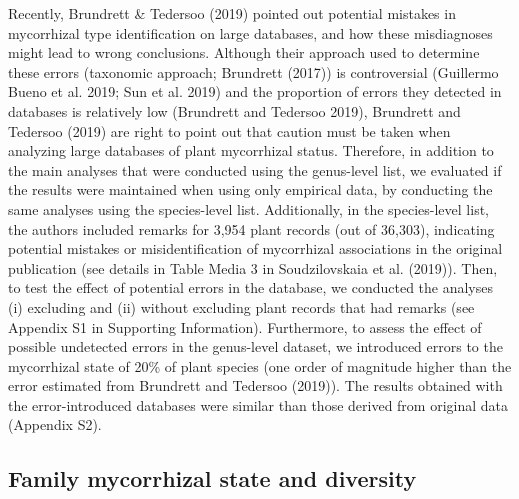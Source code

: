 \documentclass[12pt,]{article}
\begin{document}
Recently, Brundrett \& Tedersoo (2019) pointed out potential mistakes in
mycorrhizal type identification on large databases, and how these
misdiagnoses might lead to wrong conclusions. Although their approach
used to determine these errors (taxonomic approach; Brundrett (2017)) is
controversial (Guillermo Bueno et al. 2019; Sun et al. 2019) and the
proportion of errors they detected in databases is relatively low
(Brundrett and Tedersoo 2019), Brundrett and Tedersoo (2019) are right
to point out that caution must be taken when analyzing large databases
of plant mycorrhizal status. Therefore, in addition to the main analyses
that were conducted using the genus-level list, we evaluated if the
results were maintained when using only empirical data, by conducting
the same analyses using the species-level list. Additionally, in the
species-level list, the authors included remarks for 3,954 plant records
(out of 36,303), indicating potential mistakes or misidentification of
mycorrhizal associations in the original publication (see details in
Table Media 3 in Soudzilovskaia et al. (2019)). Then, to test the effect
of potential errors in the database, we conducted the analyses (i)
excluding and (ii) without excluding plant records that had remarks (see
Appendix S1 in Supporting Information). Furthermore, to assess the
effect of possible undetected errors in the genus-level dataset, we
introduced errors to the mycorrhizal state of 20\% of plant species (one
order of magnitude higher than the error estimated from Brundrett and
Tedersoo (2019)). The results obtained with the error-introduced
databases were similar than those derived from original data (Appendix
S2).

\hypertarget{family-mycorrhizal-state-and-diversity}{%
\subsection{Family mycorrhizal state and
diversity}\label{family-mycorrhizal-state-and-diversity}}
\end{document}
